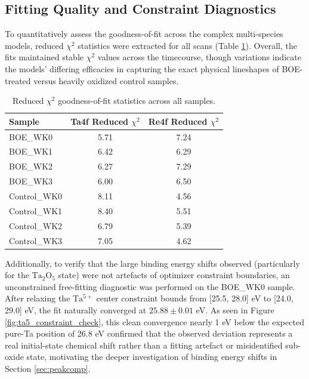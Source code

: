 \documentclass[12pt]{article}
\begin{document}
\subsection{Fitting Quality and Constraint Diagnostics}
To quantitatively assess the goodness-of-fit across the complex multi-species models, reduced $\chi^2$ statistics were extracted for all scans (Table \ref{tab:fitting_stats}). Overall, the fits maintained stable $\chi^2$ values across the timecourse, though variations indicate the models' differing efficacies in capturing the exact physical lineshapes of BOE-treated versus heavily oxidized control samples.

\begin{table}[H]
    \centering
    \begin{tabular}{lcc}
        \toprule
        \textbf{Sample} & \textbf{Ta4f Reduced $\chi^2$} & \textbf{Re4f Reduced $\chi^2$} \\
        \midrule
        BOE\_WK0     & 5.71 & 7.24 \\
        BOE\_WK1     & 6.42 & 6.29 \\
        BOE\_WK2     & 6.27 & 7.29 \\
        BOE\_WK3     & 6.00 & 6.50 \\
        Control\_WK0 & 8.11 & 4.56 \\
        Control\_WK1 & 8.40 & 5.51 \\
        Control\_WK2 & 6.79 & 5.39 \\
        Control\_WK3 & 7.05 & 4.62 \\
        \bottomrule
    \end{tabular}
    \caption{Reduced $\chi^2$ goodness-of-fit statistics across all samples.}
    \label{tab:fitting_stats}
\end{table}

Additionally, to verify that the large binding energy shifts observed (particularly for the $\mathrm{Ta_2O_5}$ state) were not artefacts of optimizer constraint boundaries, an unconstrained free-fitting diagnostic was performed on the BOE\_WK0 sample. After relaxing the $\mathrm{Ta^{5+}}$ center constraint bounds from [25.5, 28.0] eV to [24.0, 29.0] eV, the fit naturally converged at $25.88 \pm 0.01$ eV. As seen in Figure \ref{fig:ta5_constraint_check}, this clean convergence nearly 1 eV below the expected pure-Ta position of 26.8 eV confirmed that the observed deviation represents a real initial-state chemical shift rather than a fitting artefact or misidentified sub-oxide state, motivating the deeper investigation of binding energy shifts in Section \ref{sec:peakcomp}.
\end{document}
